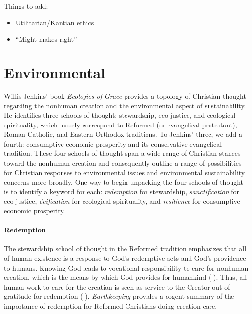 \documentclass[12pt]{article}
\begin{document}
Things to add:

\begin{itemize}

  \item Utilitarian/Kantian ethics

  \item ``Might makes right''

\end{itemize}


\section{Environmental}
\label{sec:environmental}

Willis Jenkins' book \emph{Ecologies of Grace} \autocite{Jenkins:2008}
provides a topology of Christian thought regarding the 
nonhuman creation and the
environmental aspect of sustainability.
He identifies three schools of thought:
stewardship, 
eco-justice, and 
ecological spirituality,
which loosely correspond to 
Reformed (or evangelical protestant), 
Roman Catholic, and 
Eastern Orthodox 
traditions.
To Jenkins' three, we add a fourth:
consumptive economic prosperity and
its conservative evangelical tradition. 
These four schools of thought 
span a wide range of Christian stances toward the nonhuman creation
and 
consequently outline a range of possibilities 
for Christian responses to environmental issues
and environmental sustainability concerns more broadly.
One way to begin unpacking the four schools of thought 
is to identify a keyword for each:
\emph{redemption} for stewardship, 
\emph{sanctification} for eco-justice,
\emph{deification} for ecological spirituality, and
\emph{resilience} for consumptive economic prosperity.

\paragraph{Redemption} 
\label{sec:redemption}

The stewardship school of thought in the Reformed tradition
emphasizes that all of human existence
is a response to God's redemptive acts
and God's providence to humans.
Knowing God leads to vocational responsibility 
to care for nonhuman creation,
which is the means by which God provides for humankind 
(\textcite{Jenkins:2008} \textcite[19]{Jenkins:2008}). 
Thus, all human work to care for the creation 
is seen as service to the Creator
out of gratitude for redemption (\textcite{Jenkins:2008} \textcite[77]{Jenkins:2008}).
\emph{Earthkeeping} \autocite{Wilkenson:1980aa} provides a cogent summary
of the importance of redemption for Reformed Christians doing creation care.
\end{document}
